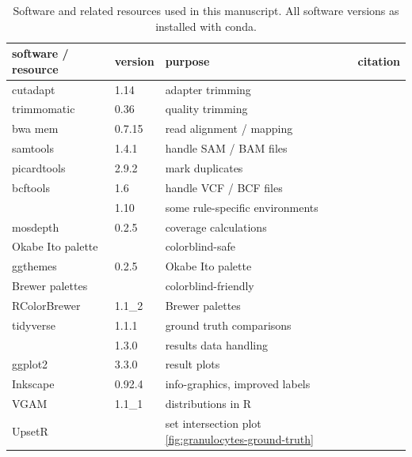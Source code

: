 \documentclass[authoryear,preprint,11pt]{scrartcl}
\begin{document}
\begin{center}
 \begin{table}[tbp]
  \caption{Software and related resources used in this manuscript. All software versions as installed with conda.}
  \label{tab:software-overview}
  \begin{tabular}{llll}
    \toprule
    software / resource & version   & purpose                       & citation \\
    \toprule
    cutadapt            & 1.14      & adapter trimming              & \citep{martin_cutadapt_2011} \\
    \midrule
    trimmomatic         & 0.36      & quality trimming              & \citep{bolger_trimmomatic_2014} \\
    \midrule
    bwa mem             & 0.7.15    & read alignment / mapping      & \citep{li_aligning_2013} \\
    \midrule
    samtools            & 1.4.1     & handle SAM / BAM files        & \citep{li_sequence_2009} \\
    \midrule
    picardtools         & 2.9.2     & mark duplicates               &  \\
    \midrule
    bcftools            & 1.6       & handle VCF / BCF files        & \citep{danecek_variant_2011} \\
                        & 1.10      & some rule-specific environments & \citep{danecek_variant_2011} \\
    \midrule
    mosdepth            & 0.2.5     & coverage calculations         & \citep{pedersen_mosdepth_2018} \\
    \midrule
    Okabe Ito palette   &           & colorblind-safe               & \citep{okabe_color_2008} \\
    \midrule
    ggthemes            & 0.2.5     & Okabe Ito palette             & \citep{arnold_ggthemes_2019} \\
    \midrule
    Brewer palettes     &           & colorblind-friendly           & \citep{brewer_colorbrewer_2006} \\
    \midrule
    RColorBrewer        & 1.1\_2     & Brewer palettes              & \citep{neuwirth_rcolorbrewer_2014} \\
    \midrule
    tidyverse           & 1.1.1     & ground truth comparisons      & \citep{wickham_welcome_2019} \\
                        & 1.3.0     & results data handling         &  \\
    \midrule
    ggplot2             & 3.3.0     & result plots                  & \citep{wickham_ggplot2_2016} \\
    \midrule
    Inkscape            & 0.92.4    & info-graphics, improved labels & \\
    \midrule
    VGAM                & 1.1\_1     & distributions in R            & \citep{yee_vgam_2008,yee_vector_2015} \\
    \midrule
    UpsetR              &           & set intersection plot \ref{fig:granulocytes-ground-truth} & \citep{conway_upsetr_2017} \\
    \bottomrule
  \end{tabular}
 \end{table}
\end{center}




\end{document}
